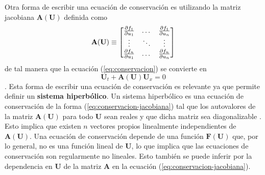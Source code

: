 Otra forma de escribir una ecuación de conservación es utilizando la matriz jacobiana $\mathbf{A(\mathbf{U})}$ definida como
\begin{equation}
	\mathbf{A(\mathbf{U})} \equiv
	\begin{bmatrix}
		\pdv{f_1}{u_1} & \dots & \pdv{f_1}{u_n} \\
		\vdots & \ddots & \vdots \\
		\pdv{f_n}{u_1} & \dots & \pdv{f_n}{u_n} \\
	\end{bmatrix}
\end{equation}
de tal manera que la ecuación (\ref{eq:conservacion}) se convierte en
\begin{equation}
	\mathbf{U}_{t} + \mathbf{A(\mathbf{U})}\mathbf{U}_{x} = 0
	\label{eq:conservacion-jacobiana}
\end{equation}.
Esta forma de escribir una ecuación de conservación es relevante ya que permite definir un \textbf{sistema hiperbólico}. Un sistema hiperbólico es una ecuación de conservación de la forma (\ref{eq:conservacion-jacobiana}) tal que los autovalores de la matriz $\mathbf{A(\mathbf{U})}$ para todo $\mathbf{U}$ sean reales y que dicha matriz sea diagonalizable \cite{Leveque}. Esto implica que existen $n$ vectores propios linealmente independientes de $\mathbf{A(\mathbf{U})}$\cite{Leveque}.
Una ecuación de conservación depende de una función $\mathbf{F(\mathbf{U})}$ que, por lo general, no es una función lineal de $\mathbf{U}$, lo que implica que las ecuaciones de conservación son regularmente no lineales\cite{Leveque}. Esto también se puede inferir por la dependencia en $\mathbf{U}$ de la matriz $\mathbf{A}$ en la ecuación (\ref{eq:conservacion-jacobiana}).
